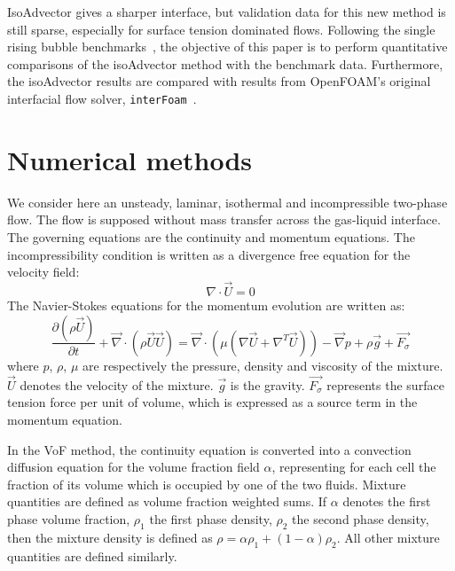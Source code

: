\documentclass[review]{elsarticle}
\begin{document}
IsoAdvector gives a sharper interface, but validation data for this new method is still sparse, especially for surface tension dominated flows. Following the single rising bubble benchmarks~\cite{Hysing2009,Adelsberger2014}, the objective of this paper is to perform quantitative comparisons of the isoAdvector method with the benchmark data. Furthermore, the isoAdvector results are compared with results from OpenFOAM's original interfacial flow solver, \verb+interFoam+~\cite{Weller2008}.

\section{Numerical methods}\label{sec_nummethods}
We consider here an unsteady, laminar, isothermal and incompressible two-phase flow. The flow is supposed without mass transfer across the gas-liquid interface. The governing equations are the continuity and momentum equations. The incompressibility condition is written as a divergence free equation for the velocity field:
\begin{equation}
  \nabla \cdot \overrightarrow{U} = 0
\label{diveqn}
\end{equation}
The Navier-Stokes equations for the momentum evolution are written as: 
\begin{equation}
  \frac{\partial(\rho \overrightarrow{U})}{\partial t} + 
  \overrightarrow{\nabla} \cdot (\rho\overrightarrow{U}\overrightarrow{U}) = 
  \overrightarrow{\nabla} \cdot \left( \mu (\nabla\overrightarrow{U}+\nabla^T\overrightarrow{U})\right)
  - \overrightarrow{\nabla} p + \rho \overrightarrow{g} + \overrightarrow{F_{\sigma}}
\label{NSeqns}
\end{equation}
where $p$, $\rho$, $\mu$ are respectively the pressure, density and viscosity of the mixture. $\overrightarrow{U}$ denotes the velocity of the mixture. $\overrightarrow{g}$ is the gravity. $\overrightarrow{F_{\sigma}}$ represents the surface tension force per unit of volume, which is expressed as a source term in the momentum equation. 

In the VoF method, the continuity equation is converted into a convection diffusion equation for the volume fraction field $\alpha$, representing for each cell the fraction of its volume which is occupied by one of the two fluids. Mixture quantities are defined as volume fraction weighted sums. If $\alpha$ denotes the first phase volume fraction, $\rho_1$ the first phase density, $\rho_2$ the second phase density, then the mixture density is defined as $\rho = \alpha\rho_1 + (1-\alpha)\rho_2$. All other mixture quantities are defined similarly.
 
\end{document}
